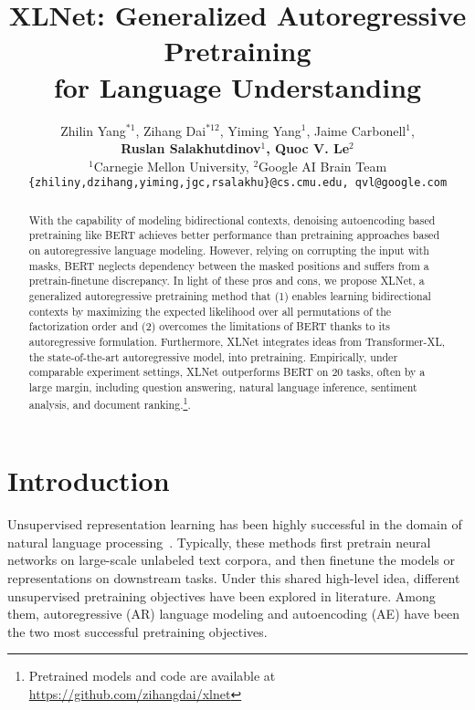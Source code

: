 \documentclass{article}
\title{XLNet: Generalized Autoregressive Pretraining \\ for Language Understanding}
\author{Zhilin Yang$^{*1}$, Zihang Dai$^{*12}$, Yiming Yang$^1$, Jaime Carbonell$^1$, \\
  {\bf Ruslan Salakhutdinov$^1$, Quoc V. Le$^2$}\\
  $^1$Carnegie Mellon University, $^2$Google AI Brain Team \\
  {\small \texttt{\{zhiliny,dzihang,yiming,jgc,rsalakhu\}@cs.cmu.edu, qvl@google.com} } 
}
\begin{document}
\maketitle

\renewcommand{\thefootnote}{\fnsymbol{footnote}}
\renewcommand{\thefootnote}{\arabic{footnote}}


\begin{abstract}
With the capability of modeling bidirectional contexts, denoising autoencoding based pretraining like BERT achieves better performance than pretraining approaches based on autoregressive language modeling.
However, relying on corrupting the input with masks, BERT neglects dependency between the masked positions and suffers from a pretrain-finetune discrepancy.
In light of these pros and cons, we propose XLNet, a generalized autoregressive pretraining method that (1) enables learning bidirectional contexts by maximizing the expected likelihood over all permutations of the factorization order and (2) overcomes the limitations of BERT thanks to its autoregressive formulation.
Furthermore, XLNet integrates ideas from Transformer-XL, the state-of-the-art autoregressive model, into pretraining.
Empirically, under comparable experiment settings, XLNet outperforms BERT on 20 tasks, often by a large margin, including question answering, natural language inference, sentiment analysis, and document ranking.\footnote{Pretrained models and code are available at \url{https://github.com/zihangdai/xlnet}}.



















\end{abstract}
 
\section{Introduction}

Unsupervised representation learning has been highly successful in the domain of natural language processing~\cite{dai2015semi,mccann2017learned,peters2018deep,radford2018improving,devlin2018bert}.
Typically, these methods first pretrain neural networks on large-scale unlabeled text corpora, and then finetune the models or representations on downstream tasks.
Under this shared high-level idea, different unsupervised pretraining objectives have been explored in literature.
Among them, autoregressive (AR) language modeling and autoencoding (AE) have been the two most successful pretraining objectives.
\end{document}
